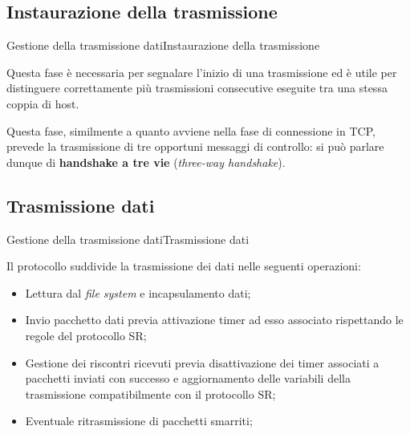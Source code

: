 \documentclass[10pt]{beamer}
\begin{document}
\subsection{Instaurazione della trasmissione}
\begin{frame}[fragile]{Gestione della trasmissione dati}{Instaurazione della trasmissione}


Questa fase è necessaria per segnalare l'inizio di una trasmissione ed è utile per distinguere correttamente più trasmissioni consecutive eseguite tra una stessa coppia di host. \\
\vspace*{10px}

Questa fase, similmente a quanto avviene nella fase di connessione in TCP, prevede la trasmissione di tre opportuni messaggi di controllo: si può parlare dunque di \textbf{handshake a tre vie} (\textit{three-way handshake}).


\end{frame}

\subsection{Trasmissione dati}
\begin{frame}[fragile]{Gestione della trasmissione dati}{Trasmissione dati}


Il protocollo suddivide la trasmissione dei dati nelle seguenti operazioni:

\begin{itemize}
\item Lettura dal \textit{file system} e incapsulamento dati;
\item Invio pacchetto dati previa attivazione timer ad esso associato rispettando le regole del protocollo SR;
\item Gestione dei riscontri ricevuti previa disattivazione dei timer associati a pacchetti inviati con successo e aggiornamento delle variabili della trasmissione compatibilmente con il protocollo SR;
\item Eventuale ritrasmissione di pacchetti smarriti;
\end{itemize}


\end{frame}
\end{document}
